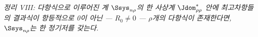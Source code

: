 
\emph{정리 VIII: 다항식으로 이루어진 계 $\Ssys_{n\rho}$의 한 사상계 $\Jdom^*_{\rho\rho}$ 안에 최고차항들의 결과식이 항등적으로 0이 아닌 --- $R_0\ne0$ --- $\rho$개의 다항식이 존재한다면, $\Ssys_{n\rho}$는 한 정기저를 갖는다.}
